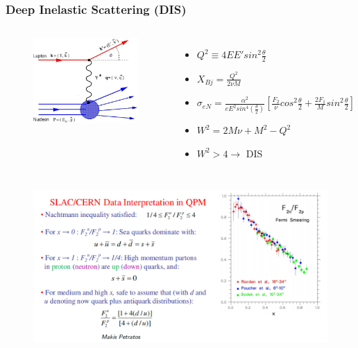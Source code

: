 \documentclass{beamer}
\begin{document}
\begin{frame}
\frametitle{Deep Inelastic Scattering (DIS)}
\begin{columns}[c] %
	
	\begin{figure}
		\includegraphics[width =5cm]{../images/DIS.pdf}
	\end{figure}
	\begin{itemize}
		\item $ Q^2 \equiv 4EE' sin^2 \frac{\theta}{2} $
		\item $X_{Bj}= \frac{Q^2}{2\nu M}$
		\item $\sigma_{eN} = \frac{\alpha^2}{eE^2sin^4(\frac{\theta}{2})} [\frac{F_2}{\nu}cos^2\frac{\theta}{2} + \frac{2F_1}{M}sin^2\frac{\theta}{2}] $
		\item  $W^2 = 2M\nu + M^2 - Q^2$
		\item $W^2 > 4 \rightarrow$ DIS
	\end{itemize}
	
	
	
\end{columns}
\end{frame}
\begin{frame}
	\vspace{-15pt}
	\begin{figure}
		\includegraphics[width =12.5cm]{../images/slac_cern_inter.pdf}
	\end{figure}
\end{frame}
\end{document}
